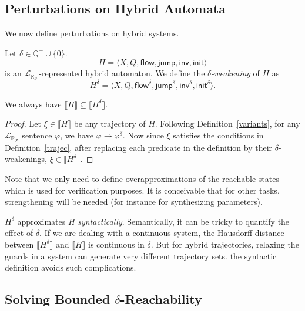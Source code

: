 \documentclass[envcountsect]{llncs}
\newcommand{\flow}{\mathsf{flow}}
\newcommand{\jump}{\mathsf{jump}}
\newcommand{\inv}{\mathsf{inv}}
\newcommand{\init}{\mathsf{init}}
\newcommand{\lrf}{\mathcal{L}_{\mathbb{R}_{\mathcal{F}}}}
\begin{document}
\subsection{Perturbations on Hybrid Automata}
We now define perturbations on hybrid systems.
\begin{definition}
Let $\delta\in\mathbb{Q}^+\cup\{0\}$. 
$$H = \langle X, Q, \flow, \jump, \inv, \init\rangle$$
is an $\lrf$-represented hybrid automaton. We define the {\em
$\delta$-weakening} of $H$ as
$$H^{\delta} = \langle X, Q, \flow^{\delta}, \jump^{\delta}, \inv^{\delta},
\init^{\delta}\rangle.$$
\end{definition}
\begin{proposition} We always have $\llbracket H\rrbracket\subseteq \llbracket
H^{\delta}\rrbracket.$
\end{proposition}
\begin{proof}
Let $\xi\in \llbracket H\rrbracket$ be any trajectory of $H$. Following
Definition~\ref{variants}, for any $\lrf$ sentence $\varphi$, we have 
$\varphi\rightarrow\varphi^{\delta}$. Now since
$\xi$ satisfies the conditions in Definition~\ref{trajec}, after replacing each
predicate in the definition by their $\delta$-weakenings, $\xi\in
\llbracket H^{\delta}\rrbracket$.
\end{proof}
\begin{remark}
Note that we only need to define overapproximations of the reachable states
which is used for verification purposes. It is conceivable that for other tasks,
strengthening will be needed (for instance for synthesizing parameters). 
\end{remark}

\begin{remark}
$H^{\delta}$ approximates $H$ {\em syntactically}. Semantically, it can be
tricky to quantify the effect of $\delta$. If we are dealing with a continuous
system, the Hausdorff distance between $\llbracket
H^{\delta}\rrbracket$ and $\llbracket H\rrbracket$ is continuous in
$\delta$. But for hybrid trajectories, relaxing the guards in a system can
generate very different trajectory sets. the syntactic
definition avoids such complications. 
\end{remark}

\subsection{Solving Bounded $\delta$-Reachability}
\end{document}
